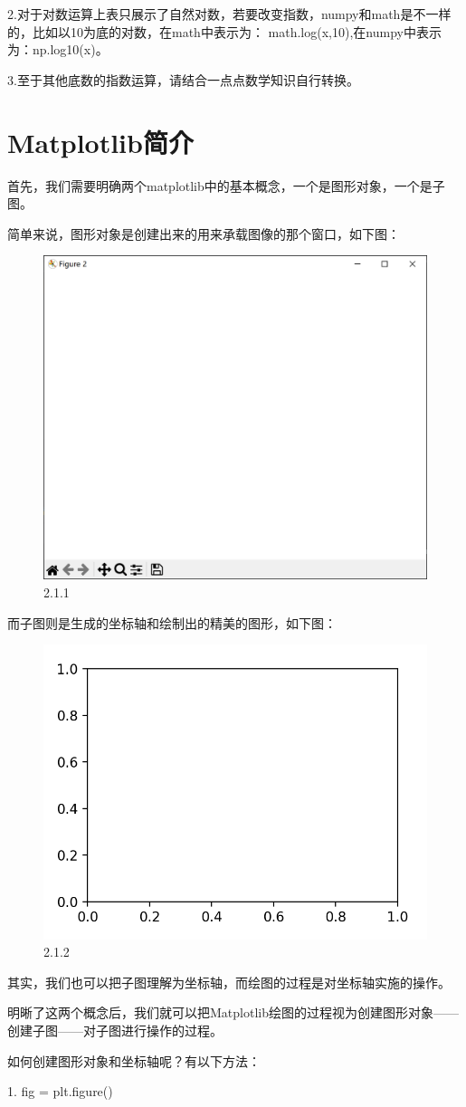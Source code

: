 \documentclass[12pt]{article}
\begin{document}
2.对于对数运算上表只展示了自然对数，若要改变指数，numpy和math是不一样的，比如以10为底的对数，在math中表示为： math.log(x,10),在numpy中表示为：np.log10(x)。

3.至于其他底数的指数运算，请结合一点点数学知识自行转换。
\newpage
\section{Matplotlib简介}
首先，我们需要明确两个matplotlib中的基本概念，一个是图形对象，一个是子图。

简单来说，图形对象是创建出来的用来承载图像的那个窗口，如下图：
\begin{figure}[H]
    \centering
    \includegraphics[width=0.5\linewidth]{图形对象样例.png}
    \caption{2.1.1}
    \label{fig:enter-label}
\end{figure}
而子图则是生成的坐标轴和绘制出的精美的图形，如下图：
\begin{figure}[H]
    \centering
    \includegraphics[width=0.5\linewidth]{子图样例.png}
    \caption{2.1.2}
    \label{fig:enter-label}
\end{figure}
其实，我们也可以把子图理解为坐标轴，而绘图的过程是对坐标轴实施的操作。

明晰了这两个概念后，我们就可以把Matplotlib绘图的过程视为创建图形对象——创建子图——对子图进行操作的过程。

如何创建图形对象和坐标轴呢？有以下方法：

1. fig = plt.figure()
\end{document}
